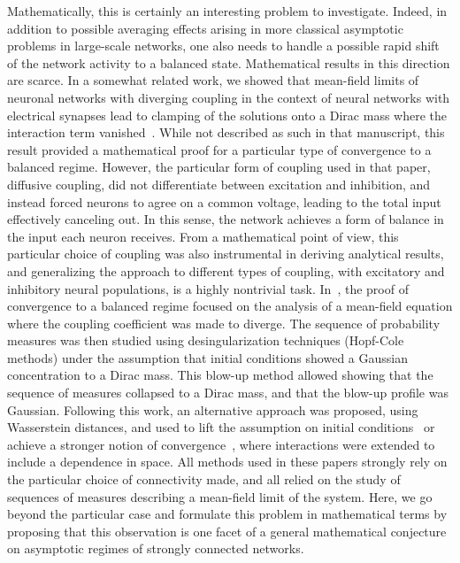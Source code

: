 \documentclass[onefignum,onetabnum]{siamart190516}
\newcommand{\1}{\mathbbm{1}}
\newcommand{\review}[1]{\textcolor{midblue}{ #1}}
\renewcommand{\review}[1]{{ #1}}
\begin{document}
\review{Mathematically, this is certainly an interesting problem to investigate. Indeed, in addition to possible averaging effects arising in more classical asymptotic problems in large-scale networks, one also needs to handle a possible rapid shift of the network activity to a balanced state. Mathematical results in this direction are scarce. In a somewhat related work, we showed that mean-field limits of neuronal networks with diverging coupling in the context of neural networks with electrical synapses lead to clamping of the solutions onto a Dirac mass where the interaction term vanished~\cite{quininao2020clamping}. While not described as such in that manuscript, this result provided a mathematical proof for a particular type of convergence to a balanced regime. However, the particular form of coupling used in that paper, diffusive coupling, did not differentiate between excitation and inhibition, and instead forced neurons to agree on a common voltage, leading to the total input effectively canceling out. In this sense, the network achieves a form of balance in the input each neuron receives. From a mathematical point of view, this particular choice of coupling was also instrumental in deriving analytical results, and generalizing the approach to different types of coupling, with excitatory and inhibitory neural populations, is a highly nontrivial task. In~\cite{quininao2020clamping}, the proof of convergence to a balanced regime focused on the analysis of a mean-field equation where the coupling coefficient was made to diverge. The sequence of probability measures was then studied using desingularization techniques (Hopf-Cole methods) under the assumption that initial conditions showed a Gaussian concentration to a Dirac mass. This blow-up method allowed showing that the sequence of measures collapsed to a Dirac mass, and that the blow-up profile was Gaussian. Following this work, an alternative approach was proposed, using Wasserstein distances, and used to lift the assumption on initial conditions~\cite{blaustein2023concentration} or achieve a stronger notion of convergence~\cite{blaustein2023large}, where interactions were extended to include a dependence in space. All methods used in these papers strongly rely on the particular choice of connectivity made, and all relied on the study of sequences of measures describing a mean-field limit of the system. Here, we go beyond the particular case and formulate this problem in mathematical terms by proposing that this observation is one facet of a general mathematical conjecture on asymptotic regimes of strongly connected networks.}
\end{document}
